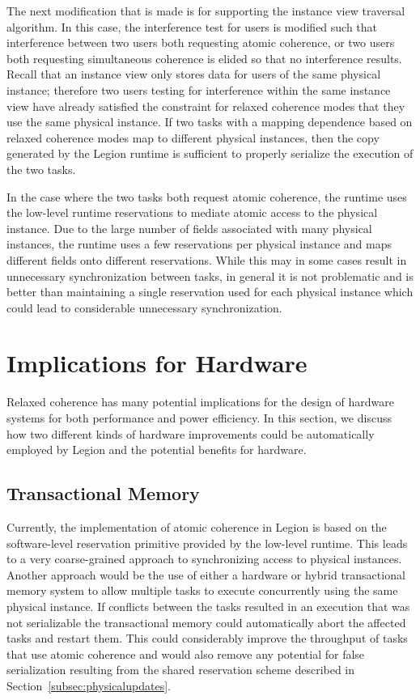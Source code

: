 The next modification that is made is for
supporting the instance view traversal algorithm.
In this case, the interference test for users
is modified such that interference between two
users both requesting atomic coherence, or two
users both requesting simultaneous coherence
is elided so that no interference results. Recall
that an instance view only stores data for users
of the same physical instance; therefore two
users testing for interference within the same
instance view have already satisfied the constraint
for relaxed coherence modes that they use
the same physical instance. If two tasks with a
mapping dependence based on relaxed coherence modes
map to different physical instances, then the copy
generated by the Legion runtime is sufficient to 
properly serialize the execution of the two tasks.

In the case where the two tasks both request 
atomic coherence, the runtime uses the low-level
runtime reservations to mediate atomic access to 
the physical instance. Due to the large number of
fields associated with many physical instances,
the runtime uses a few reservations per physical
instance and maps different fields onto 
different reservations. While
this may in some cases result in unnecessary
synchronization between tasks, in general it
is not problematic and is better than maintaining
a single reservation used for each physical 
instance which could lead to considerable 
unnecessary synchronization.

\section{Implications for Hardware}
\label{sec:hardimpl}
Relaxed coherence has many potential implications
for the design of hardware systems for both 
performance and power efficiency. In this section,
we discuss how two different kinds of hardware
improvements could be automatically employed by
Legion and the potential benefits for hardware.

\subsection{Transactional Memory}
\label{subsec:tm}
Currently, the implementation of atomic coherence
in Legion is based on the software-level reservation
primitive provided by the low-level runtime. This
leads to a very coarse-grained approach to synchronizing
access to physical instances. Another approach would be
the use of either a hardware or hybrid transactional memory 
system to allow multiple tasks to execute concurrently 
using the same physical instance. If conflicts between
the tasks resulted in an execution that was not 
serializable the transactional memory could automatically
abort the affected tasks and restart them. This could
considerably improve the throughput of tasks that use
atomic coherence and would also remove any potential
for false serialization resulting from the shared
reservation scheme described in 
Section~\ref{subsec:physicalupdates}.

